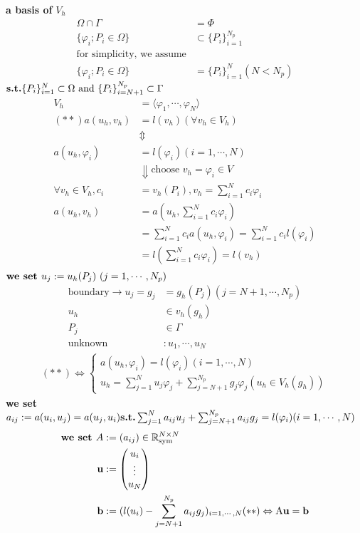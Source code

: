 \documentclass[]{report}
\newcommand{\R}{\mathbb{R}}
\begin{document}
\textbf{a basis of} $ V_h $
\begin{align*}
\Omega \cap \Gamma &= \Phi\\
\{\varphi_i ; P_i \in \Omega \} &\subset \{P_i \}_{i=1}^{N_p}\\
\text{for simplicity, we assume}\\
\{\varphi_i ; P_i \in \Omega \} &= \{P_i\}_{i=1}^N (N < N_p)
\end{align*}
$ \text{\textbf{s.t.}} \{P_i\}_{i=1}^N \subset \Omega \text{ and } \{P_i\}_{i=N+1}^{N_p} \subset \Gamma $
\begin{align*}
V_h &= \langle \varphi_1, \cdots , \varphi_N \rangle\\
(\ast \ast) a(u_h , v_h) &= l(v_h) (\forall v_h \in V_h)\\
&\Updownarrow \\
a(u_h , \varphi_i) &= l(\varphi_i) (i=1, \cdots , N)\\
&\Downarrow \text{choose } v_h = \varphi_i \in V\\
\forall v_h \in V_h, c_i &= v_h (P_i), v_h = \sum_{i=1}^{N} c_i \varphi_i \\
a(u_h,v_h) &= a(u_h,\sum_{i=1}^{N} c_i \varphi_i)\\
&=\sum_{i=1}^{N} c_i a (u_h, \varphi_i) = \sum_{i=1}^{N} c_i l(\varphi_i)\\
&= l(\sum_{i=1}^{N} c_i \varphi_i) = l(v_h)\\
\end{align*}
$ \text{\textbf{we set }} u_j := u_h(P_j) \ (j=1, \cdots , N_p) $
\begin{align*}
\text{boundary} \rightarrow u_j = g_j &= g_h(P_j) (j=N+1, \cdots , N_p)\\
u_h & \in v_h(g_h)\\
P_j  & \in \Gamma\\
\text{unknown} & : u_1, \cdots , u_N
\end{align*}
\begin{align*}
(\ast \ast) \Leftrightarrow \begin{cases}
a(u_h, \varphi_i) = l(\varphi_i) (i=1, \cdots , N)\\
u_h = \sum_{j=1}^{N} u_j \varphi_j + \sum_{j=N+1}^{N_p} g_j \varphi_j (u_h \in V_h (g_h))
\end{cases}
\end{align*}
\textbf{we set} $ a_{ij} := a(u_i, u_j) = a(u_j, u_i)\\
\text{\textbf{s.t.}} \sum_{j=1}^{N} a_{ij} u_{j} + \sum_{j=N+1}^{N_p} a_{ij} g_j = l(\varphi_i) (i=1, \cdots , N) $
\begin{align*}
\text{\textbf{we set }} A &:= (a_{ij}) \in \R_{\text{sym}}^{N \times N}\\
\text{\textbf{u}} &:= \begin{pmatrix}
u_i \\
\vdots \\
u_N
\end{pmatrix}\\
\text{\textbf{b}} &:= (l(u_i) - \sum_{j=N+1}^{N_p} a_{ij} g_j)_{i=1, \cdots , N}
(\ast \ast) \Leftrightarrow \text{A} \textbf{\text{u}} = \textbf{b}
\end{align*}
\end{document}
